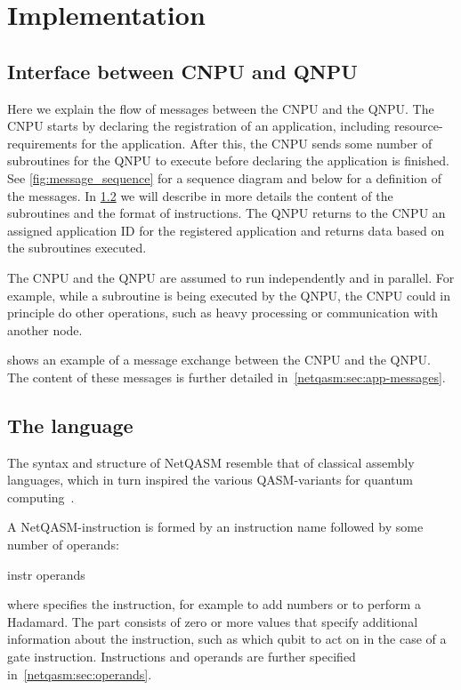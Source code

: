 \section{Implementation}
\label{netqasm:sec:implementation}


\subsection{Interface between \ac{CNPU} and \ac{QNPU}}
Here we explain the flow of messages between the \ac{CNPU} and the \ac{QNPU}.
The \ac{CNPU} starts by declaring the registration of an application, including resource-requirements for the application.
After this, the \ac{CNPU} sends some number of subroutines for the \ac{QNPU} to execute before declaring the application is finished.
See \cref{fig:message_sequence} for a sequence diagram and below for a definition of the messages.
In \cref{netqasm:sec:language} we will describe in more details the content of the subroutines and the format of instructions.
The \ac{QNPU} returns to the \ac{CNPU} an assigned application ID for the registered application and returns data based on the subroutines executed.

The \ac{CNPU} and the \ac{QNPU} are assumed to run independently and in parallel.
For example, while a subroutine is being executed by the \ac{QNPU}, the \ac{CNPU} could in principle do other operations, such as heavy processing or communication with another node.


 shows an example of a message exchange between the \ac{CNPU} and the \ac{QNPU}.
The content of these messages is further detailed in~\cref{netqasm:sec:app-messages}.



\subsection{The language}
\label{netqasm:sec:language}
The syntax and structure of \ac{NetQASM} resemble that of classical assembly languages, which in turn inspired the various QASM-variants for quantum computing~\cite{cross2017openqasm, khammassi2018cqasm, fu2019eqasm, liu2017fqasm}.

A \ac{NetQASM}-instruction is formed by an instruction name followed by some number of operands:
\begin{nqcode}
      instr operands
\end{nqcode}
where  specifies the instruction, for example  to add numbers or  to perform a Hadamard.
The  part consists of zero or more values that specify additional information about the instruction, such as which qubit to act on in the case of a gate instruction.
Instructions and operands are further specified in~\cref{netqasm:sec:operands}.

